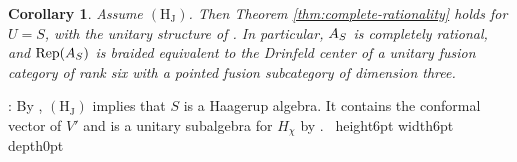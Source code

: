\documentclass[leqno]{article}
\let\cal\relax
\newcommand{\cal}{\mathcal}
\newcommand{\qed}{\hfill \vrule height6pt  width6pt depth0pt}
\DeclareMathOperator{\Rep}{Rep} %
\newtheorem{cor}[thm]{Corollary}
\newenvironment{proof}[1][]{\noindent {\it Proof #1} : }{\hbox{~}\qed
\smallskip
}
\numberwithin{equation}{section}
\begin{document}
\begin{cor}
\label{cor:S-rational}
Assume $\mathrm{(H_J)}$. Then Theorem \ref{thm:complete-rationality} holds for $U = S$, with the unitary structure of \cite[Theorem 10.10]{Arh26}. In particular, $\cal A_S$ is completely rational, and $\Rep(\cal A_S)$ is braided equivalent to the Drinfeld center of a unitary fusion category of rank six with a pointed fusion subcategory of dimension three.
\end{cor}

\begin{proof}
By \cite[Theorem 10.24]{Arh26}, $\mathrm{(H_J)}$ implies that $S$ is a Haagerup algebra. It contains the conformal vector of $V'$ and is a unitary subalgebra for $H_\chi$ by \cite[Theorem 10.10]{Arh26}.
\end{proof}
\end{document}
